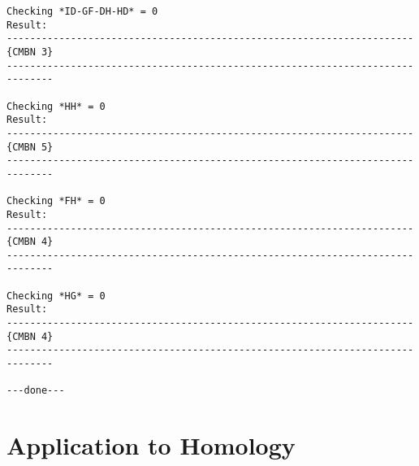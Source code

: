 {\begin{verbatim}
Checking *ID-GF-DH-HD* = 0
Result: 
----------------------------------------------------------------------{CMBN 3}
------------------------------------------------------------------------------

Checking *HH* = 0
Result: 
----------------------------------------------------------------------{CMBN 5}
------------------------------------------------------------------------------

Checking *FH* = 0
Result: 
----------------------------------------------------------------------{CMBN 4}
------------------------------------------------------------------------------

Checking *HG* = 0
Result: 
----------------------------------------------------------------------{CMBN 4}
------------------------------------------------------------------------------

---done---
\end{verbatim}}

\section {Application to Homology}

